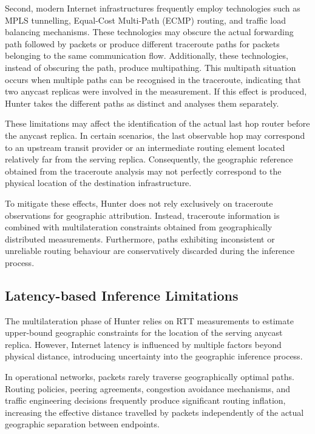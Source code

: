 \documentclass[
A4paper,                %
twoside,                %
openright,              %
chapterprefix=true,     %
12pt,                   %
headings=normal,        %
titlepage=on            %
]{book}
\begin{document}
Second, modern Internet infrastructures frequently employ technologies such as MPLS tunnelling, Equal-Cost Multi-Path (ECMP) routing, and traffic load balancing mechanisms. These technologies may obscure the actual forwarding path followed by packets or produce different traceroute paths for packets belonging to the same communication flow. Additionally, these technologies, instead of obscuring the path, produce multipathing. This multipath situation occurs when multiple paths can be recognised in the traceroute, indicating that two anycast replicas were involved in the measurement. If this effect is produced, Hunter takes the different paths as distinct and analyses them separately.

These limitations may affect the identification of the actual last hop router before the anycast replica. In certain scenarios, the last observable hop may correspond to an upstream transit provider or an intermediate routing element located relatively far from the serving replica. Consequently, the geographic reference obtained from the traceroute analysis may not perfectly correspond to the physical location of the destination infrastructure.

To mitigate these effects, Hunter does not rely exclusively on traceroute observations for geographic attribution. Instead, traceroute information is combined with multilateration constraints obtained from geographically distributed measurements. Furthermore, paths exhibiting inconsistent or unreliable routing behaviour are conservatively discarded during the inference process.

\subsection{Latency-based Inference Limitations}
\label{sc:hunter_limitations_latency_inference}

The multilateration phase of Hunter relies on RTT measurements to estimate upper-bound geographic constraints for the location of the serving anycast replica. However, Internet latency is influenced by multiple factors beyond physical distance, introducing uncertainty into the geographic inference process.

In operational networks, packets rarely traverse geographically optimal paths. Routing policies, peering agreements, congestion avoidance mechanisms, and traffic engineering decisions frequently produce significant routing inflation, increasing the effective distance travelled by packets independently of the actual geographic separation between endpoints.
\end{document}
